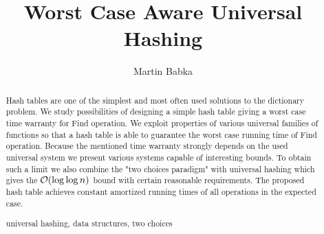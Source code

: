 \documentclass[runningheads,a4paper]{llncs}
\newcommand{\keywords}[1]{\par\addvspace\baselineskip
\noindent\keywordname\enspace\ignorespaces#1}
\begin{document}
\mainmatter

\author{Martin Babka}

\title{Worst Case Aware Universal Hashing}



\maketitle

\begin{abstract}
Hash tables are one of the simplest and most often used solutions to the dictionary problem. 
We study possibilities of designing a simple hash table giving a worst case time warranty for Find operation.
We exploit properties of various universal families of functions so that a hash table is able to guarantee the worst case running time of Find operation.
Because the mentioned time warranty strongly depends on the used universal system we present various systems capable of interesting bounds.
To obtain such a limit we also combine the "two choices paradigm" with universal hashing which gives the $\mathcal{O}(\log \log n)$ bound with certain reasonable requirements.
The proposed hash table achieves constant amortized running times of all operations in the expected case.

\keywords{universal hashing, data structures, two choices}
\end{abstract}







\end{document}

